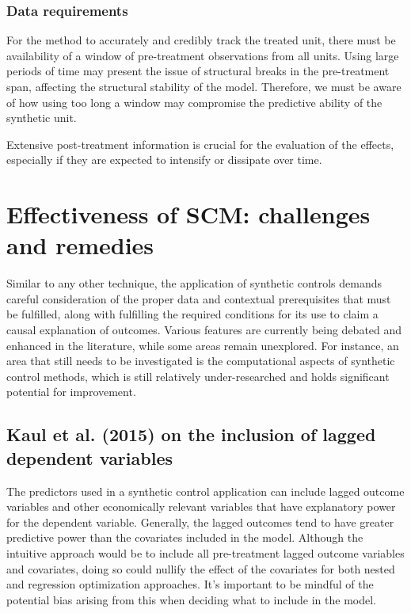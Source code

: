 \documentclass[12pt,a4paper,draft]{article}
\begin{document}
\subsubsection{Data requirements}

For the method to accurately and credibly track the treated unit, there must be 
availability of a window of pre-treatment observations from all units. Using large 
periods of time may present the issue of structural breaks in the pre-treatment 
span, affecting the structural stability of the model. 
Therefore, we must be aware of how using too long a window may compromise the 
predictive ability of the synthetic unit. 

Extensive post-treatment information is crucial for the evaluation of the effects, 
especially if they are expected to intensify or dissipate over time.



\section{Effectiveness of SCM: challenges and remedies}   %

Similar to any other technique, the application of synthetic controls demands 
careful consideration of the proper data and contextual prerequisites that must be 
fulfilled, along with fulfilling the required conditions for its use to claim a 
causal explanation of outcomes. Various features are currently being debated and 
enhanced in the literature, while some areas remain unexplored. 
For instance, an area that still needs to be investigated is the computational 
aspects of synthetic control methods, which is still relatively under-researched 
and holds significant potential for improvement.



\subsection{Kaul et al. (2015) on the inclusion of lagged dependent variables}

The predictors used in a synthetic control application can include lagged outcome 
variables and other economically relevant variables that have explanatory power for 
the dependent variable. Generally, the lagged outcomes tend to have greater predictive 
power than the covariates included in the model. Although the intuitive approach 
would be to include all pre-treatment lagged outcome variables and covariates, doing 
so could nullify the effect of the covariates for both nested and regression 
optimization approaches. It's important to be mindful of the potential bias arising 
from this when deciding what to include in the model.
\end{document}
